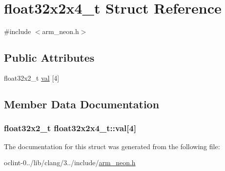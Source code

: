 \hypertarget{structfloat32x2x4__t}{\section{float32x2x4\-\_\-t Struct Reference}
\label{structfloat32x2x4__t}
}


{\ttfamily \#include $<$arm\-\_\-neon.\-h$>$}

\subsection*{Public Attributes}
\begin{DoxyCompactItemize}
\item 
float32x2\-\_\-t \hyperlink{structfloat32x2x4__t_a86cc37704240e5f888017684e8b59cd3}{val} \mbox{[}4\mbox{]}
\end{DoxyCompactItemize}


\subsection{Member Data Documentation}
\hypertarget{structfloat32x2x4__t_a86cc37704240e5f888017684e8b59cd3}{
\subsubsection[{val}]{\setlength{\rightskip}{0pt plus 5cm}float32x2\-\_\-t float32x2x4\-\_\-t\-::val\mbox{[}4\mbox{]}}}\label{structfloat32x2x4__t_a86cc37704240e5f888017684e8b59cd3}


The documentation for this struct was generated from the following file\-:\begin{DoxyCompactItemize}
\item 
oclint-\/0../lib/clang/3../include/\hyperlink{arm__neon_8h}{arm\-\_\-neon.\-h}\end{DoxyCompactItemize}
